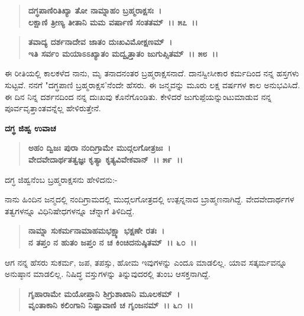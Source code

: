 \begin{verse}
\textbf{ದಗ್ಧಪಾಣಿರಿತಿಖ್ಯಾ ತೋ ನಾಮ್ನಾಹಂ ಬ್ರಹ್ಮರಾಕ್ಷಸಃ~।}\\\textbf{ಲಕ್ಷಾಣಿ ತ್ರೀಣ್ಯ ತೀತಾನಿ ಮಮ ವರ್ಷಾಣಿ ಸಂತತಮ್~।। ೫೭~।। }
\end{verse}

\begin{verse}
\textbf{ತವಾದ್ಯ ದರ್ಶನಾದೇವ ಜಾತಂ ದುಃಖವಿಮೋಕ್ಷಣಮ್~।}\\\textbf{ಇತಿ ಸರ್ವಂ ಮಯಾಽಽಖ್ಯಾತಂ ಮದ್ವೃತ್ತಾತಂ ಜುಗುಪ್ಸಿತಮ್~।। ೫೮~।।}
\end{verse}

ಈ ರೀತಿಯಲ್ಲಿ ಕಾಲಕಳೆದ ನಾನು, ಮೃ ತನಾದನಂತರ ಬ್ರಹ್ಮರಾಕ್ಷಸನಾದೆ. ದಾನಸ್ವೀಸೀಕಾರ ಕರ್ಮದಿಂದ ನನ್ನ ಹಸ್ತಗಳು ಸುಟ್ಟವೆ. ನನಗೆ "ದಗ್ಧಪಾಣಿ ಬ್ರಹ್ಮರಾಕ್ಷಸ'ನೆಂದೇ ಹೆಸರು. ಈ ಜನ್ಮವನ್ನು ಮೂರು ಲಕ್ಷ ವರ್ಷಗಳ ಕಾಲ ಅನುಭವಿಸಿದೆ. ಈ ದಿನ ನಿನ್ನ ದರ್ಶನದಿಂದ ನನ್ನ ದುಃಖವು ಕೊನೆಗೊಂಡಿತು. ಕೇಳಿದರೆ ಜುಗುಪ್ಪೆಯನ್ನುಂಟುಮಾಡುವ ನನ್ನ ಪೂರ್ವವೃತ್ತಾಂತವನ್ನೆಲ್ಲ ಹೇಳಿರುತ್ತೇನೆ.

\begin{flushleft}
\textbf{ದಗ್ಧ ಜಿಹ್ವ ಉವಾಚ\enginline{-}}
\end{flushleft}

\begin{verse}
\textbf{ಅಹಂ ದ್ವಿಜಃ ಪುರಾ ನಂದಿಗ್ರಾಮೇ ಮುದ್ಗಲಗೋತ್ರಜಃ~।}\\\textbf{ವೇದವೇದಾರ್ಥತತ್ವಜ್ಞಃ ಕೃತ್ಯಾ ಕೃತ್ಯವಿವೇಕವಾನ್~।। ೫೯~।।}
\end{verse}

\begin{flushleft}
ದಗ್ಧ ಜಿಹ್ವನೆಂಬ ಬ್ರಹ್ಮರಾಕ್ಷಸನು ಹೇಳಿದನು:-
\end{flushleft}

ನಾನು ಹಿಂದಿನ ಜನ್ಮದಲ್ಲಿ ನಂದಿಗ್ರಾಮದಲ್ಲಿ ಮುದ್ಗಲಗೋತ್ರದಲ್ಲಿ ಉತ್ಪನ್ನನಾದ ಬ್ರಾಹ್ಮಣನಾಗಿದ್ದೆ. ವೇದವೇದಾರ್ಥಗಳ ತತ್ವಗಳನ್ನೂ ವಿಧಿನಿಷೇಧಗಳನ್ನೂ ಚೆನ್ನಾಗೆ ತಿಳಿದಿದ್ದೆ.

\begin{verse}
\textbf{ನಾಮ್ನಾ ಸುಕರ್ಮನಾಮಾಹಮಭಕ್ಷ್ಯಾ ಭಕ್ಷಣೇ ರತಃ~।}\\\textbf{ನ ತಪ್ತಂ ನ ಹುತಂ ಜಪ್ತಂ ನ ಚ ಕಿಂಚಿದನುಷ್ಠಿತಮ್~।। ೬೦~।।}
\end{verse}

ಆಗ ನನ್ನ ಹೆಸರು ಸುಕರ್ಮ, ಜಪ, ತಪಸ್ಸು, ಹೋಮ ಇವುಗಳನ್ನು ಎಂದೂ ಮಾಡಲಿಲ್ಲ. ಯಾವ ಸತ್ಕರ್ಮವನ್ನೂ ಅನುಷ್ಠಾನ ಮಾಡಲಿಲ್ಲ. ನಿಷಿದ್ಧ ವಸ್ತುಗಳನ್ನು ತಿನ್ನುವುದರಲ್ಲಿ ತುಂಬ ಆಸಕ್ತನಾಗಿದ್ದೆ.

\begin{verse}
\textbf{ಗೃಹಾರಾಮೇ ಮಯೋಪ್ತಾನಿ ಶಿಗ್ರುಶಾಖಾನಿ ಮೂಲಕಮ್~।}\\\textbf{ವೃಂತಾಕಾನಿ ಕಲಿಂಗಾನಿ ನಿಷ್ಪಾವಾಣಿ ಚ ಗೃಂಜನಮ್~।। ೬೧~।।} 
\end{verse}

